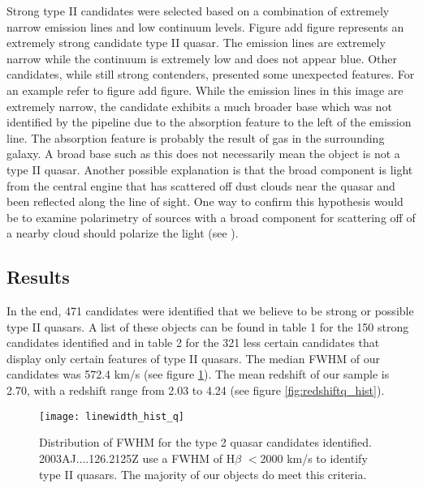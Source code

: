 \documentclass[preprint]{aastex}
\begin{document}
Strong type II candidates were selected based on a combination of extremely narrow emission lines and low continuum levels.  Figure \color{red}add figure \color{black} represents an extremely strong candidate type II quasar.  The emission lines are extremely narrow while the continuum is extremely low and does not appear blue.  Other candidates, while still strong contenders, presented some unexpected features.  For an example refer to figure \color{red}add figure\color{black}.  While the emission lines in this image are extremely narrow, the candidate exhibits a much broader base which was not identified by the pipeline due to the absorption feature to the left of the emission line.  The absorption feature is probably the result of gas in the surrounding galaxy.  A broad base such as this does not necessarily mean the object is not a type II quasar.  Another possible explanation is that the broad component is light from the central engine that has scattered off dust clouds near the quasar and been reflected along the line of sight.  One way to confirm this hypothesis would be to examine polarimetry of sources with a broad component for scattering off of a nearby cloud should polarize the light (see \cite{2005AJ....129.1212Z}).  %

\subsection{Results}

In the end, 471 candidates were identified that we believe to be strong or possible type II quasars.  A list of these objects can be found in \color{red}table 1 \color{black} for the 150 strong candidates identified and in \color{red}table 2 \color{black} for the 321 less certain candidates that display only certain features of type II quasars.  The median FWHM of our candidates was 572.4 km/s (see figure \ref{fig:linewidthq_hist}).  The mean redshift of our sample is 2.70, with a redshift range from 2.03 to 4.24 (see figure \ref{fig:redshiftq_hist}).  

\begin{figure}
\begin{center}
\texttt{[image: linewidth\_hist\_q]}
\end{center}
\caption{Distribution of FWHM for the type 2 quasar candidates identified.  {2003AJ....126.2125Z} use a FWHM of H$\beta$ $<$2000 km/s to identify type II quasars.  The majority of our objects do meet this criteria.}
\label{fig:linewidthq_hist}
\end{figure}
\end{document}
